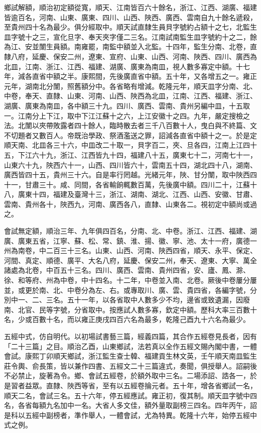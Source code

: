 \begin{pinyinscope}
鄉試解額，順治初定額從寬，順天、江南皆百六十餘名，浙江、江西、湖廣、福建皆逾百名，河南、山東、廣東、四川、山西、陜西、廣西、雲南自九十餘名遞殺，至貴州四十名為最少。俱分經取中。順天試直隸生員貝字號約占額十之七，北監生皿字號十之三，宣化旦字、奉天夾字僅二三名。江南試南監生皿字號約十之二，餘為江、安並闈生員額。南雍罷，南監中額並入北監。十四年，監生分南、北卷，直隸八府，延慶、保安二州，遼東、宣府、山東、山西、河南、陜西、四川、廣西為北皿，江南、浙江、江西、福建、湖廣、廣東為南皿，視人數多寡定中額。十七年，減各直省中額之半。康熙間，先後廣直省中額。五十年，又各增五之一。雍正元年，湖南北分闈，照舊額分中。各省略有增減。乾隆元年，順天皿字分南、北、中卷，奉天、直隸、山東、河南、山西、陜西為北皿，江南、江西、福建、浙江、湖廣、廣東為南皿，各中額三十九。四川、廣西、雲南、貴州另編中皿，十五取一。江南分上下江，取中下江江蘇十之六，上江安徽十之四。九年，嚴定搜檢之法。北闈以夾帶敗露者四十餘人，臨時散去者三千八百數十人，曳白與不終篇、文不切題者又數百人。帝既治學政、祭酒濫送之罪，詔減各直省中額十之一。於是定順天南、北皿各三十六，中皿改二十取一，貝字百二，夾、旦各四，江南上江四十五，下江六十九，浙江、江西皆九十四，福建八十五，廣東七十二，河南七十一，山東六十九，陜西六十一，山西、四川皆六十，雲南五十四，湖北四十八，湖南、廣西皆四十五，貴州三十六。自是率行罔越。光緒元年，陜、甘分闈，取中陜西四十一，甘肅三十。咸、同間，各省輸餉輒數百萬，先後廣中額。四川二十，江蘇十八，廣東十四，福建及臺灣十三，浙江、湖南、湖北、江西、山西、安徽、甘肅、雲南、貴州各十，陜西九，河南、廣西各八，直隸、山東各二。視初定中額尚或過之。

會試無定額，順治三年、九年俱四百名，分南、北、中卷。浙江、江西、福建、湖廣、廣東五省，江寧、蘇、松、常、鎮、淮、揚、徽、寧、池、太十一府，廣德一州為南卷，中二百三十三名。山東、山西、河南、陜西四省，順天、永平、保定、河間、真定、順德、廣平、大名八府，延慶、保安二州，奉天、遼東、大寧、萬全諸處為北卷，中百五十三名。四川、廣西、雲南、貴州四省，安、廬、鳳、滁、徐、和等府、州為中卷，中十四名。十二年，中卷並入南、北卷。厥後中卷屢分屢並，或更於南、北、中卷分為左、右。或專取川、廣、雲、貴四省，各編字號，分別中一、二、三名。五十一年，以各省取中人數多少不均，邊省或致遺漏，因廢南、北官、民等字號，分省取中。按應試人數多寡，欽定中額。歷科大率三百數十名，少或百數十名，而以雍正庚戌四百六名為最多，乾隆己酉九十六名為最少。

五經中式，仿自明代。以初場試書藝三篇，經義四篇，其合作五經卷見長者，因有「二十三篇」之目。順治乙酉，山東鄉試，法若真以全作五經文賜內閣中書，一體會試。康熙丁卯順天鄉試，浙江監生查士韓、福建貢生林文英，壬午順天南皿監生莊令輿、俞長策，皆以兼作四書、五經文二十三篇違式，奏聞，俱授舉人。詔嗣後不必禁止，旋著為令。鄉、會試五經卷，於額外取中三名。二場添詔、誥各一，於是習者益眾。直隸、陜西等省，至有以五經卷掄元者。五十年，增各省鄉試一名，順天二名，會試三名。五十六年，停五經應試。雍正初，復其制。順天皿字號中四名，各省每額九名加中一名。大省人多文佳，額外量取副榜三四名。四年丙午，詔是科以五經中副榜者，準作舉人，一體會試，尤為特異。乾隆十六年，始停五經中式之例。


\end{pinyinscope}
